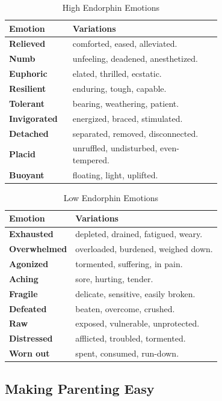 \begin{table}[H]
\centering
\caption{High Endorphin Emotions}
\begin{tabular}{@{}l p{0.7\linewidth}@{}}
\hline
\textbf{Emotion} & \textbf{Variations} \\
\hline
\textbf{Relieved} & comforted, eased, alleviated. \\
\textbf{Numb} & unfeeling, deadened, anesthetized. \\
\textbf{Euphoric} & elated, thrilled, ecstatic. \\
\textbf{Resilient} & enduring, tough, capable. \\
\textbf{Tolerant} & bearing, weathering, patient. \\
\textbf{Invigorated} & energized, braced, stimulated. \\
\textbf{Detached} & separated, removed, disconnected. \\
\textbf{Placid} & unruffled, undisturbed, even-tempered. \\
\textbf{Buoyant} & floating, light, uplifted. \\
\hline
\end{tabular}
\label{tab:endorphin-emotions}
\end{table}

\begin{table}[H]
\centering
\caption{Low Endorphin Emotions}
\begin{tabular}{@{}l p{0.7\linewidth}@{}}
\hline
\textbf{Emotion} & \textbf{Variations} \\
\hline
\textbf{Exhausted} & depleted, drained, fatigued, weary. \\
\textbf{Overwhelmed} & overloaded, burdened, weighed down. \\
\textbf{Agonized} & tormented, suffering, in pain. \\
\textbf{Aching} & sore, hurting, tender. \\
\textbf{Fragile} & delicate, sensitive, easily broken. \\
\textbf{Defeated} & beaten, overcome, crushed. \\
\textbf{Raw} & exposed, vulnerable, unprotected. \\
\textbf{Distressed} & afflicted, troubled, tormented. \\
\textbf{Worn out} & spent, consumed, run-down. \\
\hline
\end{tabular}
\label{tab:endorphin-emotions-low}
\end{table}
\newpage
\subsection{Making Parenting Easy}

